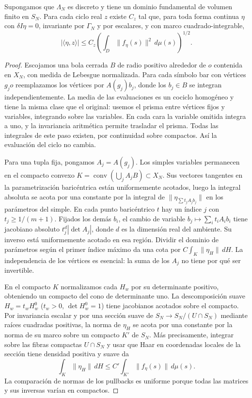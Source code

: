 \begin{proposicion}
\label{prop:sh-local}
Supongamos que $\Lambda_N$ es discreto y tiene un dominio fundamental de volumen finito en $S_N$. Para cada ciclo real $z$ existe $C_z$ tal que, para toda forma continua $\eta$ con $\delta I\eta=0$, invariante por $\Gamma_N$ y por escalares, y con marco cuadrado-integrable,
\begin{equation}
 |\langle\eta,z\rangle|\le C_z
 \left(\int_D\|f_\eta(s)\|^2\,d\mu(s)\right)^{1/2}.
 \label{eq:sh-local}
\end{equation}
\end{proposicion}
\begin{proof}
Escojamos una bola cerrada $B$ de radio positivo alrededor de $o$ contenida en $X_N$, con medida de Lebesgue normalizada. Para cada símbolo bar con vértices $g_j o$ reemplazamos los vértices por $A(g_j)b_j$, donde los $b_j\in B$ se integran independientemente. La media de las evaluaciones es un cociclo homogéneo y tiene la misma clase que el original: usemos el prisma entre vértices fijos y variables, integrando sobre las variables. En cada cara la variable omitida integra a uno, y la invariancia aritmética permite trasladar el prisma. Todas las integrales de este paso existen, por continuidad sobre compactos. Así la evaluación del ciclo no cambia.

Para una tupla fija, pongamos $A_j=A(g_j)$. Los simples variables permanecen en el compacto convexo $K=\operatorname{conv}(\bigcup_j A_j B)\subset X_N$. Sus vectores tangentes en la parametrización baricéntrica están uniformemente acotados, luego la integral absoluta se acota por una constante por la integral de $\|\eta_{\sum t_j A_jb_j}\|$ en los parámetros del simple. En cada punto baricéntrico $t$ hay un índice $j$ con $t_j\ge1/(m+1)$. Fijados los demás $b_i$, el cambio de variable $b_j\mapsto\sum_i t_iA_ib_i$ tiene jacobiano absoluto $t_j^d|\det A_j|$, donde $d$ es la dimensión real del ambiente. Su inverso está uniformemente acotado en esa región. Dividir el dominio de parámetros según el primer índice máximo da una cota por $C\int_K\|\eta_H\|\,dH$. La independencia de los vértices es esencial: la suma de los $A_j$ no tiene por qué ser invertible.

En el compacto $K$ normalizamos cada $H_w$ por su determinante positivo, obteniendo un compacto del cono de determinante uno. La descomposición suave $H_w=t_w H_w^0$ ($t_w>0$, $\det H_w^0=1$) tiene jacobianos acotados sobre el compacto. Por invariancia escalar y por una sección suave de $S_N\to S_N/(U\cap S_N)$ mediante raíces cuadradas positivas, la norma de $\eta_H$ se acota por una constante por la norma de su marco sobre un compacto $K'$ de $S_N$. Más precisamente, integrar sobre las fibras compactas $U\cap S_N$ y usar que Haar en coordenadas locales de la sección tiene densidad positiva y suave da
\[
 \int_K\|\eta_H\|\,dH\le C'\int_{K'}\|f_\eta(s)\|\,d\mu(s).
\]
La comparación de normas de los pullbacks es uniforme porque todas las matrices y sus inversas varían en compactos.


\end{proof}

